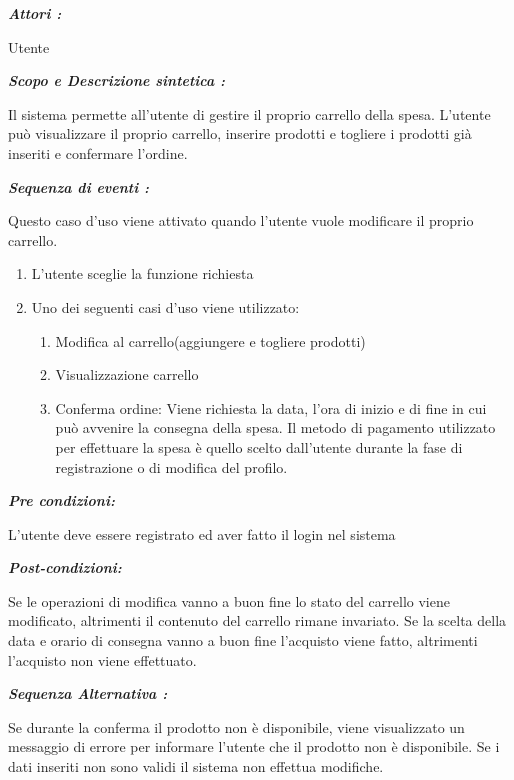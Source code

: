\documentclass{article}
\begin{document}
\newpage
\begin{mdframed}

	\noindent\textit{\textbf{Attori :}}


	Utente

	\noindent\textit{\textbf{Scopo e Descrizione sintetica :}}


	Il sistema permette all'utente di gestire il proprio carrello della spesa.
	L’utente può visualizzare il proprio carrello,
	inserire prodotti e togliere i prodotti già inseriti e confermare l’ordine. 

	\noindent\textit{\textbf{Sequenza di eventi :}}


	\hspace{\parindent} Questo caso d’uso viene attivato quando l’utente vuole modificare il proprio carrello.
	\begin{enumerate}
		\item L’utente sceglie la funzione richiesta
		\item Uno dei seguenti casi d’uso viene utilizzato:
		      \begin{enumerate}
			      \item Modifica al carrello(aggiungere e togliere prodotti)
			      \item Visualizzazione carrello
			      \item Conferma ordine:
			            Viene richiesta la data, l'ora di inizio e  di fine in cui può avvenire la consegna della spesa.
			            Il metodo di pagamento utilizzato per effettuare la spesa è quello scelto dall'utente durante la fase di registrazione o di modifica del profilo.
		      \end{enumerate}
	\end{enumerate}

	\noindent\textit{\textbf{Pre condizioni:}}


	L’utente deve essere registrato ed aver fatto il login 	nel sistema

	\noindent\textit{\textbf{Post-condizioni:}}


	Se le operazioni di modifica vanno a buon fine lo stato del carrello viene modificato,
	altrimenti il contenuto del carrello rimane invariato.
	Se la scelta della data e orario di consegna vanno a buon fine l’acquisto viene fatto, altrimenti l’acquisto
	non viene effettuato.

	\noindent\textit{\textbf{Sequenza Alternativa :}}


	Se durante la conferma il prodotto non è disponibile, viene visualizzato un
	messaggio di errore per informare l’utente che il prodotto non è disponibile.
	Se i dati inseriti non sono validi il sistema non effettua modifiche.
\end{mdframed}
\end{document}
